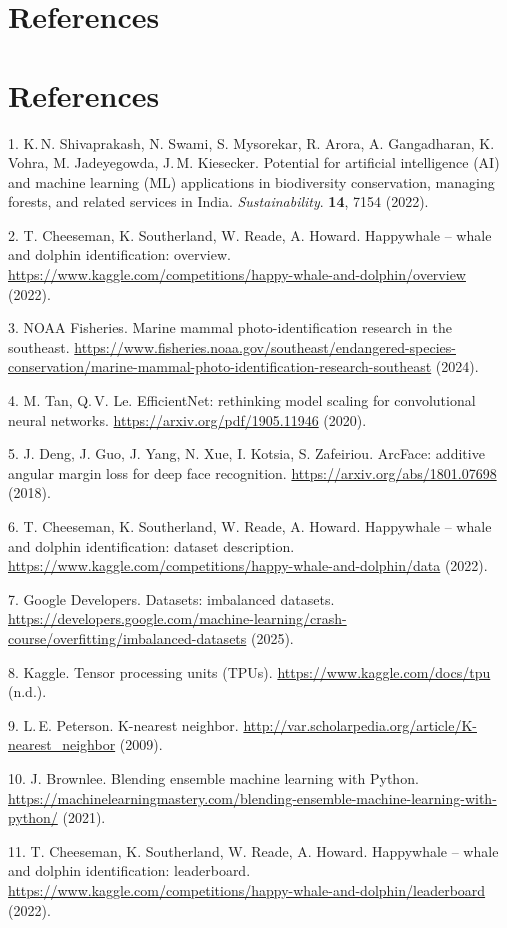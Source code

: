 \documentclass[twocolumn]{article}
\begin{document}
\section{References}
\section{References}

1. K.\,N. Shivaprakash, N. Swami, S. Mysorekar, R. Arora, A. Gangadharan, K. Vohra, M. Jadeyegowda, J.\,M. Kiesecker. Potential for artificial intelligence (AI) and machine learning (ML) applications in biodiversity conservation, managing forests, and related services in India. \textit{Sustainability}. \textbf{14}, 7154 (2022).

2. T. Cheeseman, K. Southerland, W. Reade, A. Howard. Happywhale – whale and dolphin identification: overview. \url{https://www.kaggle.com/competitions/happy-whale-and-dolphin/overview} (2022).

3. NOAA Fisheries. Marine mammal photo-identification research in the southeast. \url{https://www.fisheries.noaa.gov/southeast/endangered-species-conservation/marine-mammal-photo-identification-research-southeast} (2024).

4. M. Tan, Q.\,V. Le. EfficientNet: rethinking model scaling for convolutional neural networks. \url{https://arxiv.org/pdf/1905.11946} (2020).

5. J. Deng, J. Guo, J. Yang, N. Xue, I. Kotsia, S. Zafeiriou. ArcFace: additive angular margin loss for deep face recognition. \url{https://arxiv.org/abs/1801.07698} (2018).

6. T. Cheeseman, K. Southerland, W. Reade, A. Howard. Happywhale – whale and dolphin identification: dataset description. \url{https://www.kaggle.com/competitions/happy-whale-and-dolphin/data} (2022).

7. Google Developers. Datasets: imbalanced datasets. \url{https://developers.google.com/machine-learning/crash-course/overfitting/imbalanced-datasets} (2025).

8. Kaggle. Tensor processing units (TPUs). \url{https://www.kaggle.com/docs/tpu} (n.d.).

9. L.\,E. Peterson. K-nearest neighbor. \url{http://var.scholarpedia.org/article/K-nearest_neighbor} (2009).

10. J. Brownlee. Blending ensemble machine learning with Python. \url{https://machinelearningmastery.com/blending-ensemble-machine-learning-with-python/} (2021).

11. T. Cheeseman, K. Southerland, W. Reade, A. Howard. Happywhale – whale and dolphin identification: leaderboard. \url{https://www.kaggle.com/competitions/happy-whale-and-dolphin/leaderboard} (2022).
\end{document}
